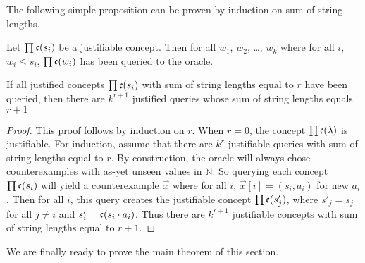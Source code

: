 The following simple proposition can be proven by induction on sum of string lengths.

\begin{proposition}
\label{subjust}
Let $\prod \mathfrak{c}(s_i)$ be a justifiable concept. 
Then for all $w_1$, $w_2$, \dots, $w_k$ where for all $i$, $w_i \le s_i$, $\prod \mathfrak{c}(w_i)$ has been queried to the oracle.
\end{proposition}

\begin{proposition}
\label{numjustconc}
If all justified concepts $\prod \mathfrak{c}(s_i)$ with sum of string lengths equal to $r$ have been queried, then there are $k^{r+1}$ justified queries whose sum of string lengths equals $r+1$
\end{proposition}
\begin{proof}
This proof follows by induction on $r$. 
When $r=0$, the concept $\prod \mathfrak{c}(\lambda)$ is justifiable.%
For induction, assume that there are $k^r$ justifiable queries with sum of string lengths equal to $r$. 
By construction, the oracle will always chose counterexamples with as-yet unseen values in $\mathbb{N}$. 
So querying each concept $\prod \mathfrak{c}(s_i)$ will yield a counterexample $\vec{x}$ where for all $i$, $\vec{x}[i] = (s_i, a_i)$ for new $a_i$.
Then for all $i$, this query creates the justifiable concept $\prod \mathfrak{c}(s'_j)$, where $s'_j = s_j$ for all $j \ne i$ and $s'_i = \mathfrak{c}(s_i \cdot a_i)$.
Thus there are $k^{r+1}$ justifiable concepts with sum of string lengths equal to $r+1$.
\end{proof}

We are finally ready to prove the main theorem of this section.

